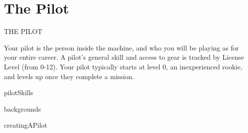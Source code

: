 \chapter{The Pilot}
  THE PILOT

Your pilot is the person inside the machine, and who you will be playing as for your entire career.
A pilot’s general skill and access to gear is tracked by License Level (from 0-12). Your pilot
typically starts at level 0, an inexperienced rookie, and levels up once they complete a
mission.


{pilotSkills}

{backgrounds}

{creatingAPilot}